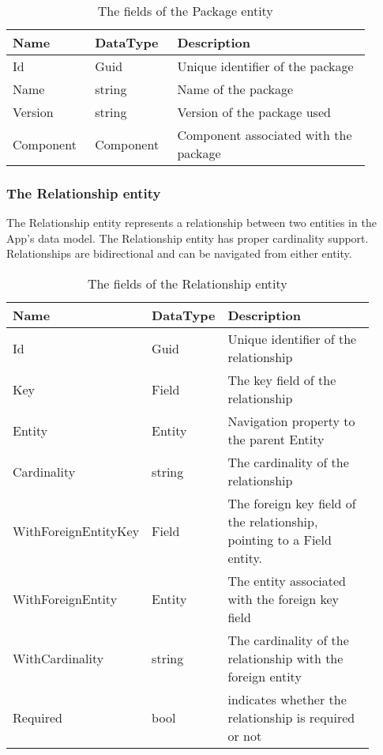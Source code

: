 \begin{table}[H]
\small
\begin{tabular}{ p{0.20\linewidth} p{0.20\linewidth} p{0.50\linewidth} }
\hline
\textbf{Name} & \textbf{DataType} & \textbf{Description} \\
\hline
Id & Guid & Unique identifier of the package \\
Name & string & Name of the package \\
Version & string & Version of the package used \\
Component & Component & Component associated with the package \\
\hline
\end{tabular}
\caption{The fields of the Package entity}
\label{table:package_entity}
\end{table}

\subsubsection{The Relationship entity}

The Relationship entity represents a relationship between two entities in the App's data
model. The Relationship entity has proper cardinality support. Relationships are
bidirectional and can be navigated from either entity.

\begin{table}[H]
\small
\begin{tabular}{ p{0.24\linewidth} p{0.12\linewidth} p{0.55\linewidth} }
\hline
\textbf{Name} & \textbf{DataType} & \textbf{Description} \\
\hline
Id & Guid & Unique identifier of the relationship \\
Key & Field & The key field of the relationship \\
Entity & Entity & Navigation property to the parent Entity \\
Cardinality & string & The cardinality of the relationship \\
WithForeignEntityKey & Field & The foreign key field of the relationship, pointing to a
Field entity. \\
WithForeignEntity & Entity & The entity associated with the foreign key field \\
WithCardinality & string & The cardinality of the relationship with the foreign entity \\
Required & bool & indicates whether the relationship is required or not \\
\hline
\end{tabular}
\caption{The fields of the Relationship entity}
\label{table:relationship_entity}
\end{table}